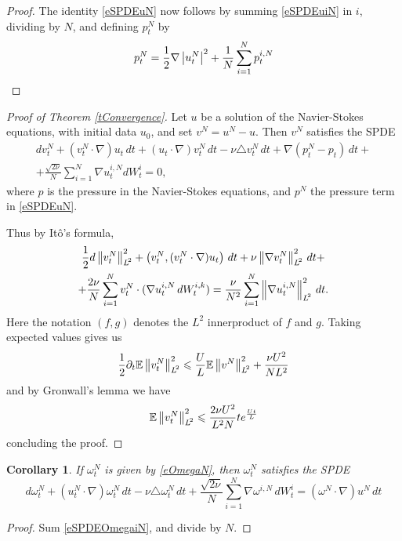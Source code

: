 \documentclass[final]{amsart}%
\newcommand{\del}{\partial}
\newcommand{\lap}{\triangle}
\newcommand{\grad}{\nabla}
\renewcommand{\leq}{\leqslant}
\newcommand{\E}{\mathbb{E}}
\newif\iftextstyle
\newcommand{\abs}[1]{\iftextstyle\lvert#1\rvert\else\left\lvert#1\right\rvert\fi}
\newcommand{\norm}[1]{\iftextstyle\lVert#1\rVert\else\left\lVert#1\right\rVert\fi}
\newcommand{\lpnorm}[2]{\norm{#1}_{\smash{L^{\!#2}_{\vphantom{h}}}\vphantom{L^{\!#2}}}}
\newcommand{\ip}[2]{\iftextstyle(\else\left(\fi #1, #2 \iftextstyle)\else\right)\fi}
\numberwithin{equation}{section}
\newtheorem{corollary}[theorem]{Corollary}
\theoremstyle{definition}
\theoremstyle{remark}
\begin{document}
\begin{proof}
The identity \eqref{eSPDEuN} now follows by summing \eqref{eSPDEuiN}
in $i$, dividing by $N$, and defining $p^N_t$ by
\begin{equation*}
  p^N_t =  \frac{1}{2} \grad \abs{u^N_t}^2 + \frac{1}{N} \sum_{i=1}^N p^{i,N}_t \qedhere
\end{equation*}
\end{proof}%

\begin{proof}[Proof of Theorem \ref{tConvergence}]
  Let $u$ be a solution of the Navier-Stokes equations, with initial
  data $u_0$, and set $v^N = u^N - u$. Then $v^N$ satisfies the SPDE
  \begin{multline*}
    dv^N_t + (v^N_t \cdot \grad)u_t \, dt + (u_t \cdot \grad) v^N_t \, dt
    - \nu \lap v^N_t \, dt + \grad(p^N_t - p_t) \, dt +\\
    + \frac{\sqrt{2 \nu}}{N} \sum_{i=1}^N \grad u^{i,N}_t
    dW^i_t = 0,
  \end{multline*}
where $p$ is the pressure in the Navier-Stokes equations, and $p^N$ the pressure term in \eqref{eSPDEuN}.

Thus by It\^o's formula,
\begin{multline*}
  \frac{1}{2} d \lpnorm{v^N_t}{2}^2 + \ip{v^N_t}{(v^N_t \cdot \grad)
    u_t} \, dt + \nu \lpnorm{\grad v^N_t}{2}^2 \, dt +\\ 
  + \frac{2\nu}{N} \sum_{i=1}^N v^N_t \cdot (\grad u^{i,N}_t \, dW^{i,k}_t) =
  \frac{\nu}{N^2} \sum_{i=1}^N \lpnorm{\grad u^{i,N}_t}{2}^2 \, dt.
\end{multline*}
Here the notation $\ip{f}{g}$ denotes the $L^2$ innerproduct of $f$
and $g$. Taking expected values gives us
$$
\frac{1}{2} \del_t \E\lpnorm{v^N_t}{2}^2 \leq \frac{U}{L} \E
\lpnorm{v^N}{2}^2 + \frac{\nu U^2}{N L^2}
$$
and by Gronwall's lemma we have
$$
\E \lpnorm{v^N_t}{2}^2 \leq \frac{ 2 \nu U^2}{L^2 N} t e^{\frac{U t}{L}}
$$
concluding the proof.
\end{proof}
\iffalse%
\begin{corollary}
If $\omega^N_t$ is given by \eqref{eOmegaN}, then $\omega^N_t$ satisfies the SPDE
\begin{equation}
\label{eSPDEOmegaN}
d\omega^N_t + \left( u^N_t \cdot \grad \right) \omega^N_t \, dt - \nu \lap \omega^N_t \, dt + \frac{\sqrt{2\nu}}{N} \sum_{i=1}^N \grad \omega^{i,N}\,dW^i_t = \left( \omega^N \cdot \grad\right) u^N \, dt
\end{equation}
\end{corollary}
\begin{proof}
Sum \eqref{eSPDEOmegaiN}, and divide by $N$.
\end{proof}
\end{document}
